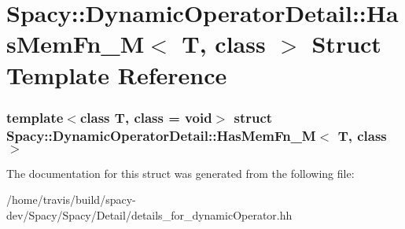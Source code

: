 \hypertarget{structSpacy_1_1DynamicOperatorDetail_1_1HasMemFn__M}{\section{\-Spacy\-:\-:\-Dynamic\-Operator\-Detail\-:\-:\-Has\-Mem\-Fn\-\_\-\-M$<$ \-T, class $>$ \-Struct \-Template \-Reference}
\label{structSpacy_1_1DynamicOperatorDetail_1_1HasMemFn__M}
}
\subsubsection*{template$<$class T, class = void$>$ struct Spacy\-::\-Dynamic\-Operator\-Detail\-::\-Has\-Mem\-Fn\-\_\-\-M$<$ T, class $>$}



\-The documentation for this struct was generated from the following file\-:\begin{DoxyCompactItemize}
\item 
/home/travis/build/spacy-\/dev/\-Spacy/\-Spacy/\-Detail/details\-\_\-for\-\_\-dynamic\-Operator.\-hh\end{DoxyCompactItemize}
